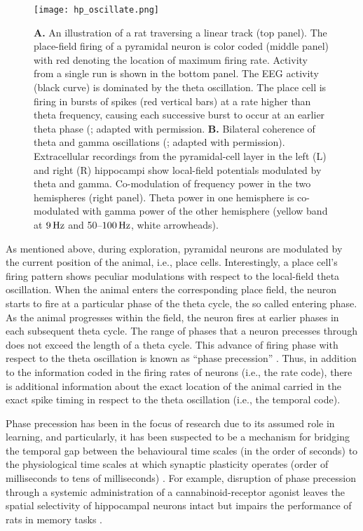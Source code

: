     \begin{figure}
      \center
      \texttt{[image: hp\_oscillate.png]}
      \caption{
        {\bf A.} An illustration of a rat traversing a linear track (top panel). The
        place-field firing of a pyramidal neuron is color coded
        (middle panel) with red denoting the location of maximum firing rate.
        Activity from a single run is shown in the bottom panel. The EEG activity
        (black curve) is dominated by the theta oscillation. The place cell is
        firing in bursts of spikes (red vertical bars) at a rate higher than theta
        frequency, causing each successive burst to occur at an earlier theta
        phase (\citealp{Huxter2003}; adapted with permission.
        {\bf B.} Bilateral coherence of theta and gamma oscillations
        (\citealp{Buzsaki2003}; adapted with permission). Extracellular
        recordings from the pyramidal-cell layer in the left (L) and right (R)
        hippocampi show local-field potentials modulated by theta and gamma.
        Co-modulation of frequency power in the two hemispheres (right
        panel). Theta power in one hemisphere is co-modulated with gamma power
        of the other hemisphere (yellow band at $9\,\rm Hz$ and 50--$100\, \rm
        Hz$, white arrowheads).
             }
    \label{fig:hp_oscillate}
    \end{figure}

    As mentioned above, during exploration, pyramidal neurons are modulated by
    the current position of the animal, i.e., place cells. Interestingly, a
    place cell's firing pattern shows peculiar modulations with respect to the
    local-field theta oscillation. When the animal enters the corresponding
    place field, the neuron starts to fire at a particular phase of the theta
    cycle, the so called entering phase. As the animal progresses within the
    field, the neuron fires at earlier phases in each subsequent theta cycle.
    The range of phases that a neuron precesses through does not exceed the
    length of a theta cycle. This advance of firing phase with respect to the
    theta oscillation is known as ``phase precession'' \citep{OKeefe1993}.  Thus,
    in addition to the information coded in the firing rates of neurons (i.e.,
    the rate code), there is additional information about the exact location of
    the animal carried in the exact spike timing in respect to the theta
    oscillation (i.e., the temporal code).
    
    Phase precession has been in the focus of research due to its assumed role
    in learning, and particularly, it has been suspected to be a mechanism for
    bridging the temporal gap between the behavioural time scales (in the order
    of seconds) to the physiological time scales at which synaptic plasticity
    operates (order of milliseconds to tens of milliseconds) \citep{Bi1998}.
    For example, disruption of phase precession through a systemic
    administration of a cannabinoid-receptor agonist leaves the spatial
    selectivity of hippocampal neurons intact but impairs the performance of
    rats in memory tasks \citep{Robbe2009}.
    
